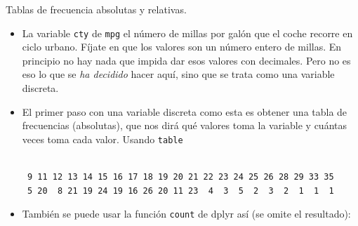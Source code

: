 \documentclass[
  9pt,
  ignorenonframetext,
]{beamer}
\newenvironment{Shaded}{\begin{snugshade}}{\end{snugshade}}
\newcommand{\KeywordTok}[1]{\textcolor[rgb]{0.13,0.29,0.53}{\textbf{#1}}}
\newcommand{\NormalTok}[1]{#1}
\newcommand{\OperatorTok}[1]{\textcolor[rgb]{0.81,0.36,0.00}{\textbf{#1}}}
\newcommand{\StringTok}[1]{\textcolor[rgb]{0.31,0.60,0.02}{#1}}
\begin{document}
\begin{frame}[fragile]{Tablas de frecuencia absolutas y relativas.}
\protect\hypertarget{tablas-de-frecuencia-absolutas-y-relativas.}{}

\begin{itemize}
\item
  La variable \texttt{cty} de \texttt{mpg} el número de millas por galón
  que el coche recorre en ciclo urbano. Fíjate en que los valores son un
  número entero de millas. En principio no hay nada que impida dar esos
  valores con decimales. Pero no es eso lo que se \emph{ha decidido}
  hacer aquí, sino que se trata como una variable discreta.
\item
  El primer paso con una variable discreta como esta es obtener una
  tabla de frecuencias (absolutas), que nos dirá qué valores toma la
  variable y cuántas veces toma cada valor. Usando \texttt{table} \small

\begin{Shaded}
\end{Shaded}

\begin{verbatim}

 9 11 12 13 14 15 16 17 18 19 20 21 22 23 24 25 26 28 29 33 35 
 5 20  8 21 19 24 19 16 26 20 11 23  4  3  5  2  3  2  1  1  1 
\end{verbatim}
\end{itemize}

\normalsize

\begin{itemize}
\item
  También se puede usar la función \texttt{count} de dplyr así (se omite
  el resultado):

\begin{Shaded}
\end{Shaded}
\end{itemize}

\end{frame}
\end{document}
